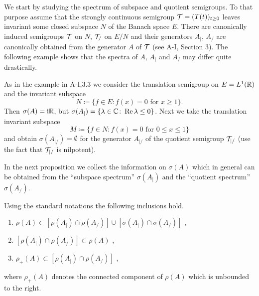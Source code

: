 We start by studying the spectrum of subspace and quotient semigroups.
To that purpose assume that the strongly continuous semigroup $\mathcal{T} = (T(t))_{t \geq 0}$ leaves invariant some closed subspace $N$ of the Banach space $E$.
There are canonically induced semigroups $\mathcal{T}_{|}$ on $N$, \resp $\mathcal{T}_{/}$ on $E/N$ and their generators $A_{|}$, \resp $A_{/}$ are canonically obtained from the generator $A$ of $\mathcal{T}$ (see A-I, Section 3).
The following example shows that the spectra of $A$, $A_{|}$ and $A_{/}$ may differ quite drastically.
\begin{example}\label{ex:a3-4.1}
As in the example in A-I,3.3 we consider the translation semigroup on $E = L^{1}(\mathbb{R})$ and the 
invariant subspace 
%
\[
	N \coloneqq \{f \in E \colon f(x) = 0 \text{ for } x \geq 1\} .
\]
%
Then $\sigma(A) = \mathrm{i}\mathbb{R}$, but $\sigma(A_{|}) = \{\lambda \in \mathbb{C} \colon \mathop{}\!\mathrm{Re}\,\lambda \leq 0\}$.
Next we take the translation invariant subspace 
%
\[
	M \coloneqq \{f \in N \colon f(x) = 0 \text{ for } 0 \leq x \leq 1\}
\]
%
and obtain $\sigma(A_{|/}) = \emptyset$ for the generator $A_{|/}$ of the quotient semigroup $\mathcal{T}_{|/}$ (use the fact that $\mathcal{T}_{|/}$ is nilpotent).
\end{example}
In the next proposition we collect the information on $\sigma(A)$ which in general can be obtained from the \enquote{subspace spectrum} $\sigma(A_{|})$ and the \enquote{quotient spectrum} $\sigma(A_{/})$.
\begin{proposition}\label{prop:a3-4.2}
Using the standard notations the following inclusions hold.
\begin{enumerate}[\upshape (i)]
\item 
$\rho(A) \subset [\rho(A_{|}) \cap \rho(A_{/})] \cup [\sigma(A_{|}) \cap \sigma(A_{/})]$ ,

\item 
$[\rho(A_{|}) \cap \rho(A_{/})] \subset \rho(A) $ ,

\item 
$\rho_{+}(A) \subset [\rho(A_{|}) \cap \rho(A_{/})]$ ,
\end{enumerate}
 where $\rho_{+}(A)$ denotes the connected component of $\rho(A)$ which is unbounded to the right.

\end{proposition}

